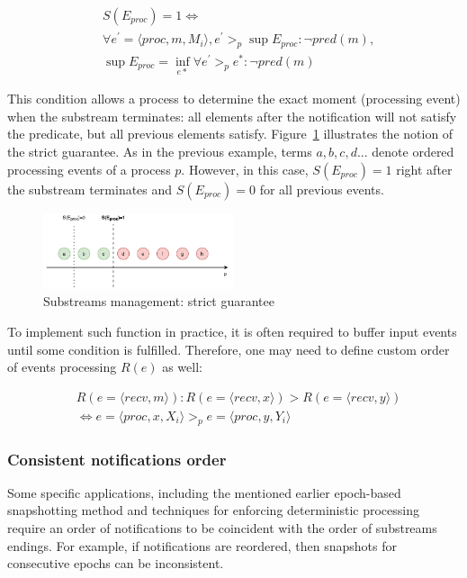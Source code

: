 \begin{align*}
& S(E_{proc}) = 1  \Longleftrightarrow \\
& \forall e^{'} = \langle proc,m,M_i\rangle, e^{'} >_p \sup E_{proc} : \neg pred(m), \\
& \sup E_{proc} = \inf_{e*} \forall e^{'} >_p e^{*} : \neg pred(m) 
\end{align*}

This condition allows a process to determine the exact moment (processing event) when the substream terminates: all elements after the notification will not satisfy the predicate, but all previous elements satisfy. Figure~\ref{strict_guarantees} illustrates the notion of the strict guarantee. As in the previous example, terms $a,b,c,d...$ denote ordered processing events of a process $p$. However, in this case, $S(E_{proc})=1$ right after the substream terminates and $S(E_{proc})=0$ for all previous events.

\begin{figure}[htbp]
  \centering
  \includegraphics[width=0.50\textwidth]{pics/strict-guarantee.pdf}
  \caption{Substreams management: strict guarantee}
  \label{strict_guarantees}
\end{figure}

To implement such function in practice, it is often required to buffer input events until some condition is fulfilled. Therefore, one may need to define custom order of events processing $R(e)$ as well:

\begin{align*}
& R(e=\langle recv,m\rangle): R(e=\langle recv, x\rangle) > R(e=\langle recv, y\rangle) \\
& \Longleftrightarrow e=\langle proc,x,X_i\rangle >_p e=\langle proc,y,Y_i\rangle
\end{align*}

\subsubsection{Consistent notifications order}
Some specific applications, including the mentioned earlier epoch-based snapshotting method and techniques for enforcing deterministic processing~\cite{we2018adbis} require an order of notifications to be coincident with the order of substreams endings. For example, if notifications are reordered, then snapshots for consecutive epochs can be inconsistent.

